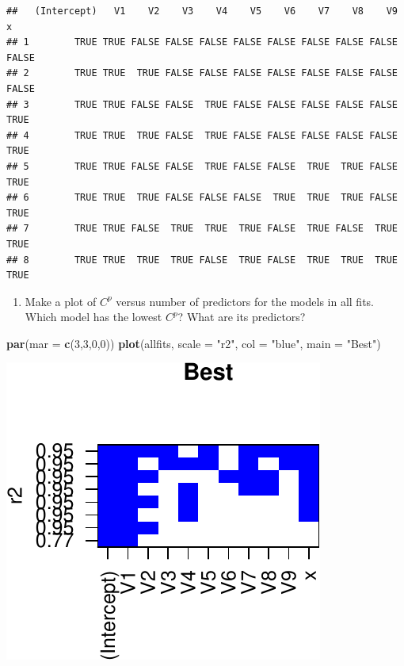 \documentclass[]{article}
\newenvironment{Shaded}{\begin{snugshade}}{\end{snugshade}}
\newcommand{\DataTypeTok}[1]{\textcolor[rgb]{0.13,0.29,0.53}{#1}}
\newcommand{\DecValTok}[1]{\textcolor[rgb]{0.00,0.00,0.81}{#1}}
\newcommand{\KeywordTok}[1]{\textcolor[rgb]{0.13,0.29,0.53}{\textbf{#1}}}
\newcommand{\NormalTok}[1]{#1}
\newcommand{\StringTok}[1]{\textcolor[rgb]{0.31,0.60,0.02}{#1}}
\providecommand{\tightlist}{%
  \setlength{\itemsep}{0pt}\setlength{\parskip}{0pt}}
\begin{document}
\begin{verbatim}
##   (Intercept)   V1    V2    V3    V4    V5    V6    V7    V8    V9     x
## 1        TRUE TRUE FALSE FALSE FALSE FALSE FALSE FALSE FALSE FALSE FALSE
## 2        TRUE TRUE  TRUE FALSE FALSE FALSE FALSE FALSE FALSE FALSE FALSE
## 3        TRUE TRUE FALSE FALSE  TRUE FALSE FALSE FALSE FALSE FALSE  TRUE
## 4        TRUE TRUE  TRUE FALSE  TRUE FALSE FALSE FALSE FALSE FALSE  TRUE
## 5        TRUE TRUE FALSE FALSE  TRUE FALSE FALSE  TRUE  TRUE FALSE  TRUE
## 6        TRUE TRUE  TRUE FALSE FALSE FALSE  TRUE  TRUE  TRUE FALSE  TRUE
## 7        TRUE TRUE FALSE  TRUE  TRUE  TRUE FALSE  TRUE FALSE  TRUE  TRUE
## 8        TRUE TRUE  TRUE  TRUE FALSE  TRUE FALSE  TRUE  TRUE  TRUE  TRUE
\end{verbatim}

\begin{enumerate}
\def\labelenumi{(\alph{enumi})}
\setcounter{enumi}{1}
\tightlist
\item
  Make a plot of \(C^p\) versus number of predictors for the models in
  all fits. Which model has the lowest \(C^p\)? What are its predictors?
\end{enumerate}

\begin{Shaded}
\begin{Highlighting}[]
\KeywordTok{par}\NormalTok{(}\DataTypeTok{mar =} \KeywordTok{c}\NormalTok{(}\DecValTok{3}\NormalTok{,}\DecValTok{3}\NormalTok{,}\DecValTok{0}\NormalTok{,}\DecValTok{0}\NormalTok{))}
\KeywordTok{plot}\NormalTok{(allfits, }\DataTypeTok{scale =} \StringTok{"r2"}\NormalTok{, }\DataTypeTok{col =} \StringTok{"blue"}\NormalTok{, }\DataTypeTok{main =} \StringTok{"Best"}\NormalTok{)}
\end{Highlighting}
\end{Shaded}

\begin{center}\includegraphics{sol_A3_files/figure-latex/unnamed-chunk-23-1} \end{center}
\end{document}
